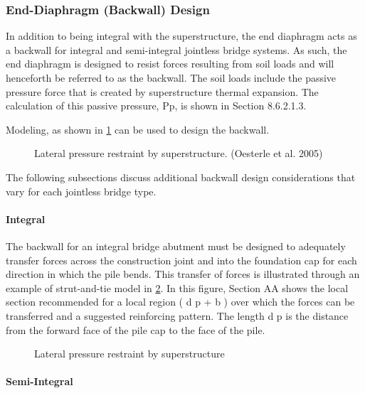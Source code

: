\subsubsection{End-Diaphragm (Backwall) Design}

In addition to being integral with the superstructure, the end diaphragm acts as a backwall for integral and semi-integral jointless bridge systems. As such, the end diaphragm is designed to resist forces resulting from soil loads and will henceforth be referred to as the backwall. The soil loads include the passive pressure force that is created by superstructure thermal expansion. The calculation of this passive pressure, Pp, is shown in Section 8.6.2.1.3.

Modeling, as shown in \cref{fig:lateral-pressure-superstructure} can be used to design the backwall.

\begin{figure}
  \caption{Lateral pressure restraint by superstructure. (Oesterle et al. 2005)}
  \label{fig:lateral-pressure-superstructure}
\end{figure}

The following subsections discuss additional backwall design considerations that vary for each jointless bridge type.

\paragraph{Integral}

The backwall for an integral bridge abutment must be designed to adequately transfer forces across the construction joint and into the foundation cap for each direction in which the pile bends. This transfer of forces is illustrated through an example of strut-and-tie model in \cref{fig:lateral-pressure}. In this figure, Section AA shows the local section recommended for a local region ( d p + b ) over which the forces can be transferred and a suggested reinforcing pattern. The length d p is the distance from the forward face of the pile cap to the face of the pile.

\begin{figure}
  \caption{Lateral pressure restraint by superstructure}
  \label{fig:lateral-pressure}
\end{figure}

\paragraph{Semi-Integral}

